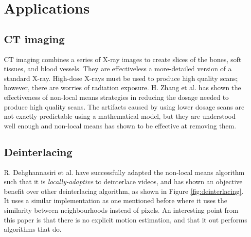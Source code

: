 \section{Applications}

\subsection{CT imaging}

CT imaging combines a series of X-ray images to create slices of the bones, soft tissues, and
blood vessels. They are effectiveless a more-detailed version of a standard X-ray.
High-dose X-rays must be used to produce high quality scans; however, there are worries of
radiation exposure. 
H. Zhang et al. \cite{zhang2017applications} has shown the effectiveness of non-local means strategies
in reducing the dosage needed to produce high quality scans.
The artifacts caused by using lower dosage scans are not exactly predictable using a mathematical model,
but they are understood well enough and non-local means has shown to be effective at removing them.

\subsection{Deinterlacing}

R. Dehghannasiri et al. \cite{dehghannasiri2012novel} have successfully adapted the non-local means
algorithm such that it is \emph{locally-adaptive} to deinterlace videos, and has shown an objective
benefit over other deinterlacing algorithm, as shown in Figure \ref{fig:deinterlacing}.
It uses a similar implementation as one mentioned before where it uses the similarity between
neighbourhoods instead of pixels.
An interesting point from this paper is that there is no explicit motion estimation, and that it
out performs algorithms that do.

